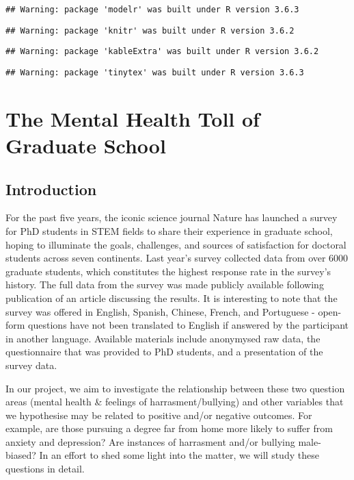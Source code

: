 \documentclass[
]{article}
\begin{document}
\begin{verbatim}
## Warning: package 'modelr' was built under R version 3.6.3
\end{verbatim}

\begin{verbatim}
## Warning: package 'knitr' was built under R version 3.6.2
\end{verbatim}

\begin{verbatim}
## Warning: package 'kableExtra' was built under R version 3.6.2
\end{verbatim}

\begin{verbatim}
## Warning: package 'tinytex' was built under R version 3.6.3
\end{verbatim}

\hypertarget{the-mental-health-toll-of-graduate-school}{%
\section{The Mental Health Toll of Graduate
School}\label{the-mental-health-toll-of-graduate-school}}

\hypertarget{introduction}{%
\subsection{Introduction}\label{introduction}}

For the past five years, the iconic science journal Nature has launched
a survey for PhD students in STEM fields to share their experience in
graduate school, hoping to illuminate the goals, challenges, and sources
of satisfaction for doctoral students across seven continents. Last
year's survey collected data from over 6000 graduate students, which
constitutes the highest response rate in the survey's history. The full
data from the survey was made publicly available following publication
of an article discussing the results. It is interesting to note that the
survey was offered in English, Spanish, Chinese, French, and Portuguese
- open-form questions have not been translated to English if answered by
the participant in another language. Available materials include
anonymysed raw data, the questionnaire that was provided to PhD
students, and a presentation of the survey data.

In our project, we aim to investigate the relationship between these two
question areas (mental health \& feelings of harrasment/bullying) and
other variables that we hypothesise may be related to positive and/or
negative outcomes. For example, are those pursuing a degree far from
home more likely to suffer from anxiety and depression? Are instances of
harrasment and/or bullying male-biased? In an effort to shed some light
into the matter, we will study these questions in detail.
\end{document}
